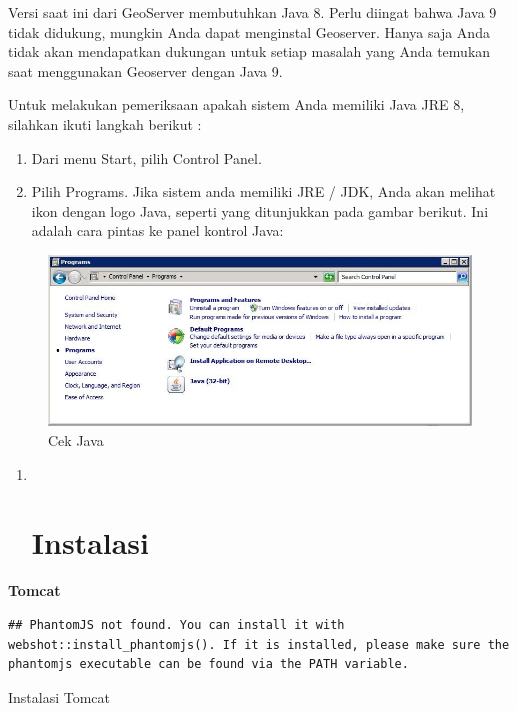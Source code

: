 \documentclass[]{book}
\begin{document}
Versi saat ini dari GeoServer membutuhkan Java 8. Perlu diingat bahwa Java 9 tidak didukung, mungkin Anda dapat menginstal Geoserver. Hanya saja Anda tidak akan mendapatkan
dukungan untuk setiap masalah yang Anda temukan saat menggunakan Geoserver dengan Java 9.

Untuk melakukan pemeriksaan apakah sistem Anda memiliki Java JRE 8, silahkan ikuti langkah berikut :

\begin{enumerate}
\def\labelenumi{\arabic{enumi}.}
\item
  Dari menu Start, pilih Control Panel.
\item
  Pilih Programs. Jika sistem anda memiliki JRE / JDK, Anda akan melihat ikon dengan
  logo Java, seperti yang ditunjukkan pada gambar berikut. Ini adalah cara pintas ke panel kontrol Java:
\end{enumerate}

\begin{figure}

{\centering \includegraphics[width=0.6\linewidth]{images/07/fig71} 

}

\caption{Cek Java}\label{fig:fig71}
\end{figure}

\begin{enumerate}
\def\labelenumi{\arabic{enumi}.}
\setcounter{enumi}{2}
\item ~
  \hypertarget{instalasi}{%
  \section{Instalasi}\label{instalasi}}
\end{enumerate}

\textbf{Tomcat}

\begin{verbatim}
## PhantomJS not found. You can install it with webshot::install_phantomjs(). If it is installed, please make sure the phantomjs executable can be found via the PATH variable.
\end{verbatim}

\label{fig:embed1}Instalasi Tomcat
\end{document}
